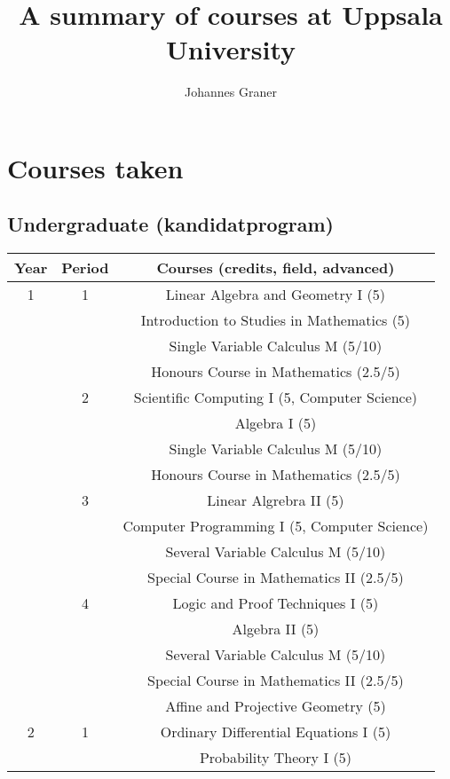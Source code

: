 \documentclass{article}
\title{A summary of courses at Uppsala University}
\author{Johannes Graner}
\begin{document}
  
  \maketitle

  \section{Courses taken}

  \subsection{Undergraduate (kandidatprogram)}

  \begin{longtable}{|c|c|c|}
    \hline
    Year & Period & Courses (credits, field, advanced) \\
    \hline
    1 & 1 & Linear Algebra and Geometry I (5) \\
      &   & Introduction to Studies in Mathematics (5) \\
      &   & Single Variable Calculus M (5/10) \\
      &   & Honours Course in Mathematics (2.5/5) \\
    \hline
      & 2 & Scientific Computing I (5, Computer Science) \\
      &   & Algebra I (5) \\
      &   & Single Variable Calculus M (5/10) \\
      &   & Honours Course in Mathematics (2.5/5) \\
    \hline
      & 3 & Linear Algrebra II (5) \\
      &   & Computer Programming I (5, Computer Science) \\
      &   & Several Variable Calculus M (5/10) \\
      &   & Special Course in Mathematics II (2.5/5) \\
    \hline
      & 4 & Logic and Proof Techniques I (5) \\
      &   & Algebra II (5) \\
      &   & Several Variable Calculus M (5/10) \\
      &   & Special Course in Mathematics II (2.5/5) \\
      &   & Affine and Projective Geometry (5) \\
    \hline
    2 & 1 & Ordinary Differential Equations I (5) \\
      &   & Probability Theory I (5) \\

\end{longtable}
\end{document}
